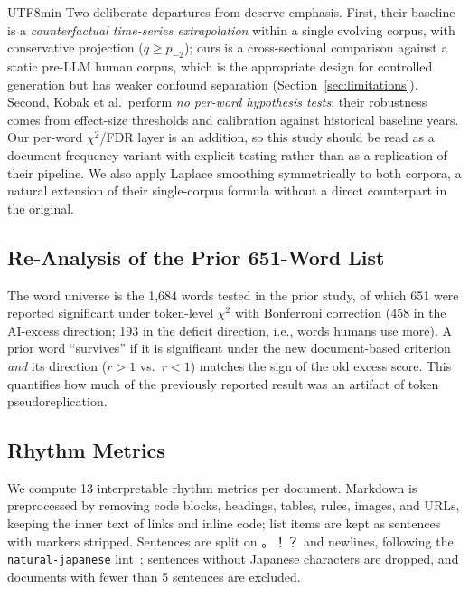 \documentclass[11pt,a4paper]{article}
\begin{document}
\begin{CJK}{UTF8}{min}
Two deliberate departures from \citet{kobak2025excess} deserve emphasis. First, their baseline is a \emph{counterfactual time-series extrapolation} within a single evolving corpus, with conservative projection ($q \geq p_{-2}$); ours is a cross-sectional comparison against a static pre-LLM human corpus, which is the appropriate design for controlled generation but has weaker confound separation (Section~\ref{sec:limitations}). Second, Kobak et al.\ perform \emph{no per-word hypothesis tests}: their robustness comes from effect-size thresholds and calibration against historical baseline years. Our per-word $\chi^2$/FDR layer is an addition, so this study should be read as a document-frequency variant with explicit testing rather than as a replication of their pipeline. We also apply Laplace smoothing symmetrically to both corpora, a natural extension of their single-corpus formula without a direct counterpart in the original.

\subsection{Re-Analysis of the Prior 651-Word List}
\label{sec:reanalysis}

The word universe is the 1{,}684 words tested in the prior study, of which 651 were reported significant under token-level $\chi^2$ with Bonferroni correction (458 in the AI-excess direction; 193 in the deficit direction, i.e., words humans use more). A prior word ``survives'' if it is significant under the new document-based criterion \emph{and} its direction ($r>1$ vs.\ $r<1$) matches the sign of the old excess score. This quantifies how much of the previously reported result was an artifact of token pseudoreplication.

\subsection{Rhythm Metrics}
\label{sec:rhythmmethod}

We compute 13 interpretable rhythm metrics per document. Markdown is preprocessed by removing code blocks, headings, tables, rules, images, and URLs, keeping the inner text of links and inline code; list items are kept as sentences with markers stripped. Sentences are split on 。！？ and newlines, following the \texttt{natural-japanese} lint~\citep{mizoguchi2026natural}; sentences without Japanese characters are dropped, and documents with fewer than 5 sentences are excluded.


\end{CJK}
\end{document}
